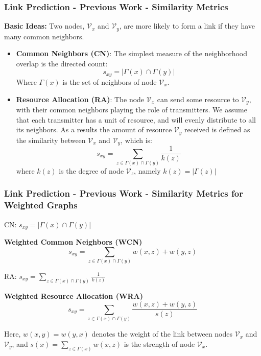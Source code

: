 \documentclass[9pt]{beamer}
\begin{document}
\begin{frame}
\frametitle{Link Prediction - Previous Work - Similarity Metrics}
\textbf{Basic Ideas:} Two nodes, $\mathcal{V}_x$ and $\mathcal{V}_y$, are more likely to form a link if they have many common neighbors. 
\begin{itemize}
\item \textbf{Common Neighbors (CN)}: The simplest measure of the neighborhood overlap is the directed count:
\begin{equation}
s_{xy}=|\Gamma(x)\cap\Gamma(y)|
\end{equation}
Where $\Gamma(x)$ is the set of neighbors of node $\mathcal{V}_x$. 
\item \textbf{Resource Allocation (RA)}: The node $\mathcal{V}_x$ can send some resource to $\mathcal{V}_y$, with their common neighbors playing the role of transmitters. We assume that each transmitter has a unit of resource, and will evenly distribute to all its neighbors. As a results the amount of resource $\mathcal{V}_y$ received is defined as the similarity
between $\mathcal{V}_x$ and $\mathcal{V}_y$, which is:
\begin{equation}
s_{xy}=\sum_{z\in \Gamma(x)\cap\Gamma(y)}\frac{1}{k(z)}
\end{equation}
where $k(z)$ is the degree of node $\mathcal{V}_z$, namely $k(z) = |\Gamma(z)|$
\end{itemize}
\end{frame}

\begin{frame}
\frametitle{Link Prediction - Previous Work - Similarity Metrics for Weighted Graphs}
CN: $s_{xy}=|\Gamma(x)\cap\Gamma(y)|$

\textbf{Weighted Common Neighbors (WCN)}
\begin{equation}
s_{xy}=\sum_{z\in \Gamma(x)\cap\Gamma(y)}w(x,z)+w(y,z)
\end{equation}

RA: $s_{xy}=\sum_{z\in \Gamma(x)\cap\Gamma(y)}\frac{1}{k(z)}$

\textbf{Weighted Resource Allocation (WRA)}
\begin{equation}
s_{xy}=\sum_{z\in \Gamma(x)\cap\Gamma(y)}\frac{w(x,z)+w(y,z)}{s(z)}
\end{equation}

Here, $w(x, y) = w(y, x)$ denotes the weight of the link between nodes $\mathcal{V}_x$ and $\mathcal{V}_y$, and $s(x)=\sum_{z\in\Gamma(x)}w(x,z)$ is the strength of node $\mathcal{V}_x$.
\end{frame}
\end{document}
